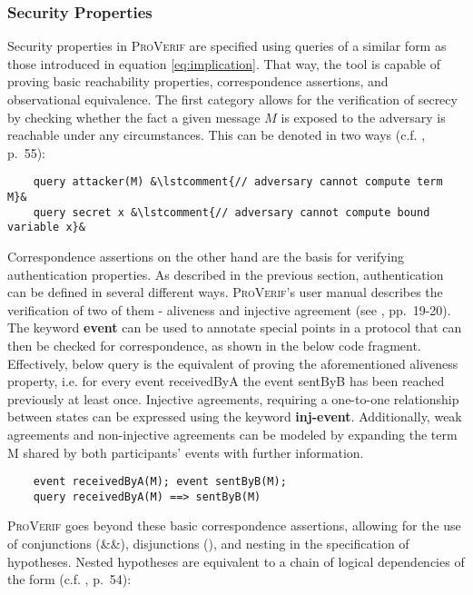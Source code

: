 \subsubsection{Security Properties}

Security properties in \textsc{ProVerif} are specified using queries of a similar form as those introduced in equation \ref{eq:implication}.
That way, the tool is capable of proving basic reachability properties, correspondence assertions, and observational equivalence.
The first category allows for the verification of secrecy by checking whether the fact a given message $M$ is exposed to the adversary is reachable under any circumstances.
This can be denoted in two ways (c.f. \cite{blanchet2020proverif}, p.~55):

\begin{lstlisting}
    query attacker(M) &\lstcomment{// adversary cannot compute term M}&
    query secret x &\lstcomment{// adversary cannot compute bound variable x}&
\end{lstlisting}

Correspondence assertions on the other hand are the basis for verifying authentication properties.
As described in the previous section, authentication can be defined in several different ways.
\textsc{ProVerif}'s user manual describes the verification of two of them - aliveness and injective agreement (see \cite{blanchet2020proverif}, pp.~19-20).
The keyword \textsf{\textbf{event}} can be used to annotate special points in a protocol that can then be checked for correspondence, as shown in the below code fragment.
Effectively, below query is the equivalent of proving the aforementioned aliveness property, i.e. for every event \textsf{receivedByA} the event \textsf{sentByB} has been reached previously at least once.
Injective agreements, requiring a one-to-one relationship between states can be expressed using the keyword \textsf{\textbf{inj-event}}.
Additionally, weak agreements and non-injective agreements can be modeled by expanding the term \textsf{M} shared by both participants' events with further information.

\begin{lstlisting}
    event receivedByA(M); event sentByB(M);
    query receivedByA(M) ==> sentByB(M)
\end{lstlisting}

\noindent
\textsc{ProVerif} goes beyond these basic correspondence assertions, allowing for the use of conjunctions (\textsf{\&\&}), disjunctions (\textsf{\textbar\textbar}), and nesting in the specification of hypotheses.
Nested hypotheses are equivalent to a chain of logical dependencies of the form (c.f. \cite{blanchet2020proverif}, p.~54):


